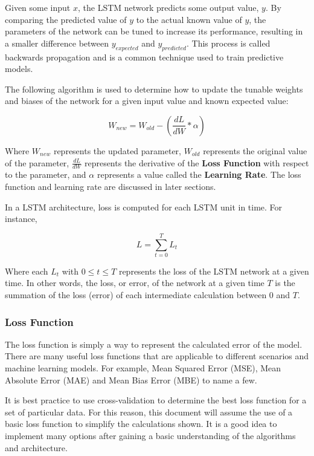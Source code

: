 \documentclass[12pt]{article}
\begin{document}
Given some input $x$, the LSTM network predicts some output value, $y$. By
comparing the predicted value of $y$ to the actual known value of $y$, the
parameters of the network can be tuned to increase its performance, resulting
in a smaller difference between $y_{expected}$ and $y_{predicted}$. This
process is called backwards propagation and is a common technique used to train
predictive models.

The following algorithm is used to determine how to update the tunable weights
and biases of the network for a given input value and known expected value:

\begin{equation}
    W_{new} = W_{old} - (\frac{dL}{dW} * \alpha)
\end{equation}

Where $W_{new}$ represents the updated parameter, $W_{old}$ represents the
original value of the parameter, $\frac{dL}{dW}$ represents the derivative of
the \textbf{Loss Function} with respect to the parameter, and $\alpha$
represents a value called the \textbf{Learning Rate}. The loss function and
learning rate are discussed in later sections.

In a LSTM architecture, loss is computed for each LSTM unit in time. For
instance,

\begin{equation}
    L = \sum_{t=0}^{T}L_t
\end{equation}

Where each $L_t$ with $0 \le t \le T$ represents the loss of the LSTM network
at a given time. In other words, the loss, or error, of the network at a given
time $T$ is the summation of the loss (error) of each intermediate calculation
between 0 and $T$.

\subsubsection{Loss Function}

The loss function is simply a way to represent the calculated error of the
model. There are many useful loss functions that are applicable to different
scenarios and machine learning models. For example, Mean Squared Error (MSE),
Mean Absolute Error (MAE) and Mean Bias Error (MBE) to name a few.

It is best practice to use cross-validation to determine the best loss function
for a set of particular data. For this reason, this document will assume the
use of a basic loss function to simplify the calculations shown. It is a good
idea to implement many options after gaining a basic understanding of the
algorithms and architecture.
\end{document}
